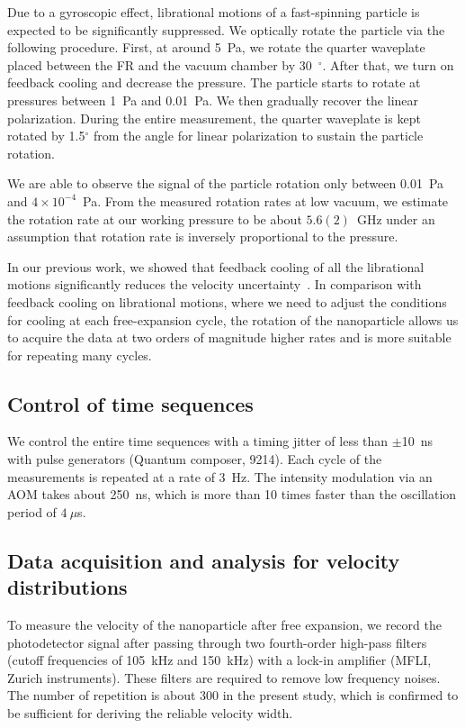 \documentclass[aps, prl, 
amsmath, showpacs, preprintnumbers, twocolumn, amssymb, amsmath, superscriptaddress]{revtex4-1}
\begin{document}
Due to a gyroscopic effect, librational motions of a fast-spinning particle is expected to be significantly suppressed. We optically rotate the particle via the following procedure. First, at around 5~Pa, we rotate the quarter waveplate placed between the FR and the vacuum chamber by 30~$^\circ$. After that, we turn on feedback cooling and decrease the pressure. The particle starts to rotate at pressures between 1~Pa and 0.01~Pa. We then gradually recover the linear polarization. During the entire measurement, the quarter waveplate is kept rotated by 1.5$^\circ$ from the angle for linear polarization to sustain the particle rotation.

We are able to observe the signal of the particle rotation only between 0.01~Pa and $4\times 10^{-4}$~Pa. From the measured rotation rates at low vacuum, we estimate the rotation rate at our working pressure to be about $5.6(2)$~GHz under an assumption that rotation rate is inversely proportional to the pressure. 

In our previous work, we showed that feedback cooling of all the librational motions significantly reduces the velocity uncertainty~\cite{kamba2023revealing}. In comparison with feedback cooling on librational motions, where we need to adjust the conditions for cooling at each free-expansion cycle, the rotation of the nanoparticle allows us to acquire the data at two orders of magnitude higher rates and is more suitable for repeating many cycles.


\subsection{Control of time sequences}
We control the entire time sequences with a timing jitter of less than $\pm$10~ns with pulse generators (Quantum composer, 9214). Each cycle of the measurements is repeated at a rate of 3~Hz. The intensity modulation via an AOM takes about 250~ns, which is more than 10 times faster than the oscillation period of $4~\mu$s. 




\subsection{Data acquisition and analysis for velocity distributions}
To measure the velocity of the nanoparticle after free expansion, we record the photodetector signal after passing through two fourth-order high-pass filters (cutoff frequencies of 105~kHz and 150~kHz) with a lock-in amplifier (MFLI, Zurich instruments). These filters are required to remove low frequency noises. The number of repetition is about 300 in the present study, which is confirmed to be sufficient for deriving the reliable velocity width.
\end{document}
